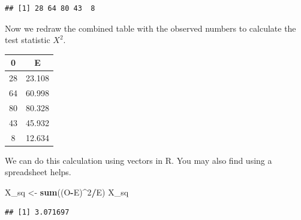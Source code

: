 \documentclass[
]{book}
\newenvironment{Shaded}{\begin{snugshade}}{\end{snugshade}}
\newcommand{\CommentTok}[1]{\textcolor[rgb]{0.56,0.35,0.01}{\textit{#1}}}
\newcommand{\DecValTok}[1]{\textcolor[rgb]{0.00,0.00,0.81}{#1}}
\newcommand{\KeywordTok}[1]{\textcolor[rgb]{0.13,0.29,0.53}{\textbf{#1}}}
\newcommand{\NormalTok}[1]{#1}
\newcommand{\OperatorTok}[1]{\textcolor[rgb]{0.81,0.36,0.00}{\textbf{#1}}}
\newcommand{\StringTok}[1]{\textcolor[rgb]{0.31,0.60,0.02}{#1}}
\theoremstyle{definition}
\theoremstyle{definition}
\theoremstyle{definition}
\theoremstyle{definition}
\theoremstyle{remark}
\begin{document}
\begin{Shaded}
\end{Shaded}

\begin{verbatim}
## [1] 28 64 80 43  8
\end{verbatim}

Now we redraw the combined table with the observed numbers to calculate the test statistic \(X^2\).

\begin{longtable}[]{@{}cc@{}}
\toprule
0 & E\tabularnewline
\midrule
\endhead
28 & 23.108\tabularnewline
64 & 60.998\tabularnewline
80 & 80.328\tabularnewline
43 & 45.932\tabularnewline
8 & 12.634\tabularnewline
\bottomrule
\end{longtable}

We can do this calculation using vectors in R. You may also find using a spreadsheet helps.

\begin{Shaded}
\begin{Highlighting}[]
\NormalTok{X_sq <-}\StringTok{ }\KeywordTok{sum}\NormalTok{((O}\OperatorTok{-}\NormalTok{E)}\OperatorTok{^}\DecValTok{2}\OperatorTok{/}\NormalTok{E) }
\NormalTok{X_sq}
\end{Highlighting}
\end{Shaded}

\begin{verbatim}
## [1] 3.071697
\end{verbatim}
\end{document}
